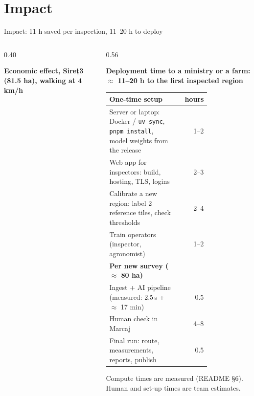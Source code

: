\documentclass[aspectratio=169, 11pt, t]{beamer}
\begin{document}
\section{Impact}

\begin{frame}{Impact: 11 h saved per inspection, 11--20 h to deploy}
  \begin{columns}[T]
    \begin{column}{0.40\textwidth}
      {\scriptsize\bfseries\color{sxNight} Economic effect, Sireț3 (81.5 ha), walking at 4\,km/h\par}
      \vspace{1.5mm}
      \vspace{2mm}

      \vspace{2mm}

    \end{column}
    \begin{column}{0.56\textwidth}
      {\scriptsize\bfseries\color{sxNight} Deployment time to a ministry or a farm: $\approx$ 11--20 h to the first inspected region\par}
      \vspace{1.5mm}
      {\tiny
      \begin{tabular}{@{}p{0.70\linewidth} r@{}}
        \toprule
        \textbf{One-time setup} & \textbf{hours}\\
        \midrule
        Server or laptop: Docker / \texttt{uv sync}, \texttt{pnpm install}, model weights from the release & 1--2\\
        Web app for inspectors: build, hosting, TLS, logins & 2--3\\
        Calibrate a new region: label 2 reference tiles, check thresholds & 2--4\\
        Train operators (inspector, agronomist) & 1--2\\
        \midrule
        \textbf{Per new survey ($\approx$ 80 ha)} & \\
        \midrule
        Ingest + AI pipeline (measured: 2.5\,s + $\approx$ 17 min) & 0.5\\
        Human check in Marcaj & 4--8\\
        Final run: route, measurements, reports, publish & 0.5\\
        \bottomrule
      \end{tabular}\par}
      \vspace{1.5mm}
      {\tiny\color{sxGrey} Compute times are measured (README §6). Human and set-up times are team estimates.\par}
    \end{column}
  \end{columns}
\end{frame}
\end{document}
